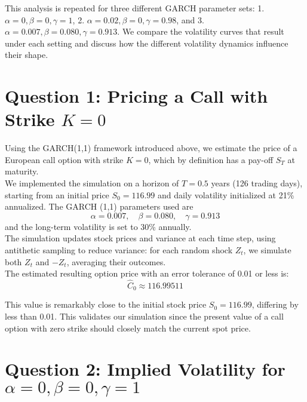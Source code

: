 \documentclass{report}
\begin{document}
This analysis is repeated for three different GARCH parameter sets: 1. $\alpha = 0, \beta = 0, \gamma = 1$, 2. $\alpha = 0.02, \beta = 0, \gamma = 0.98$, and 3. $\alpha = 0.007, \beta = 0.080, \gamma = 0.913$. We compare the volatility curves that result under each setting and discuss how the different volatility dynamics influence their shape.

\newpage






\section*{Question 1: Pricing a Call with Strike \( K = 0 \)}

Using the GARCH(1,1) framework introduced above, we estimate the price of a European call option with strike \( K = 0 \), which by definition has a pay-off \( S_T \) at maturity. \\

We implemented the simulation on a horizon of \( T = 0.5 \) years (126 trading days), starting from an initial price \( S_0 = 116.99 \) and daily volatility initialized at 21\% annualized. The GARCH (1,1) parameters used are
\[
\alpha = 0.007, \quad \beta = 0.080, \quad \gamma = 0.913
\]
and the long-term volatility is set to 30\% annually. \\

The simulation updates stock prices and variance at each time step, using antithetic sampling to reduce variance: for each random shock \( Z_t \), we simulate both \( Z_t \) and \( -Z_t \), averaging their outcomes. \\

The estimated resulting option price with an error tolerance of 0.01 or less is:
\[
\hat{C}_0 \approx 116.99511
\]

This value is remarkably close to the initial stock price \( S_0 = 116.99 \), differing by less than 0.01. This validates our simulation since the present value of a call option with zero strike should closely match the current spot price. \\

\newpage









\section*{Question 2: Implied Volatility for \(\alpha = 0, \beta = 0, \gamma = 1\)}
\end{document}
